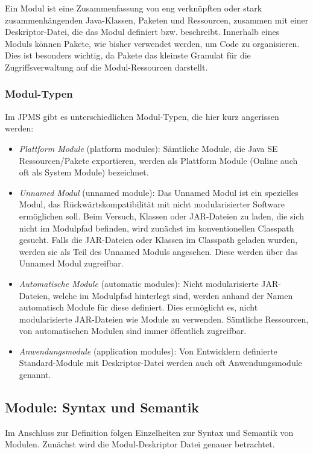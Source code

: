 \begin{mdframed}[style=mystyle, frametitle=Modul-Definition]
	Ein Modul ist eine Zusammenfassung von eng verknüpften oder stark zusammenhängenden Java-Klassen, Paketen und Ressourcen, zusammen mit einer Deskriptor-Datei, die das Modul definiert bzw. beschreibt.
	Innerhalb eines Moduls können Pakete, wie bisher verwendet werden, um Code zu organisieren.
	Dies ist besonders wichtig, da Pakete das kleinste Granulat für die Zugriffsverwaltung auf die Modul-Ressourcen darstellt.
\end{mdframed}

\subsubsection{Modul-Typen}
Im JPMS gibt es unterschiedlichen Modul-Typen, die hier kurz angerissen werden:

\begin{itemize}
	\item \textit{Plattform Module} (platform modules): Sämtliche Module, die Java SE Ressourcen/Pakete exportieren, werden als Plattform Module (Online auch oft als System Module) bezeichnet.
	
	\item \textit{Unnamed Modul} (unnamed module): Das Unnamed Modul ist ein spezielles Modul, das Rückwärtskompatibilität mit nicht modularisierter Software ermöglichen soll. 
	Beim Versuch, Klassen oder JAR-Dateien zu laden, die sich nicht im Modulpfad befinden, wird zunächst im konventionellen Classpath gesucht. 
	Falls die JAR-Dateien oder Klassen im Classpath geladen wurden, werden sie als Teil des Unnamed Moduls angesehen. 
	Diese werden über das Unnamed Modul zugreifbar.
	
	\item \textit{Automatische Module} (automatic modules): Nicht modularisierte JAR-Dateien, welche im Modulpfad  hinterlegt sind, werden anhand der Namen automatisch Module für diese definiert. 
	Dies ermöglicht es, nicht modularisierte JAR-Dateien wie Module zu verwenden. 
	Sämtliche Ressourcen, von automatischen Modulen sind immer öffentlich zugreifbar.
	
	\item \textit{Anwendungsmodule} (application modules): Von Entwicklern definierte Standard-Module mit Deskriptor-Datei werden auch oft Anwendungsmodule genannt.
\end{itemize}


\subsection{Module: Syntax und Semantik}
Im Anschluss zur Definition folgen Einzelheiten zur Syntax und Semantik von Modulen. 
Zunächst wird die Modul-Deskriptor Datei genauer betrachtet. 

